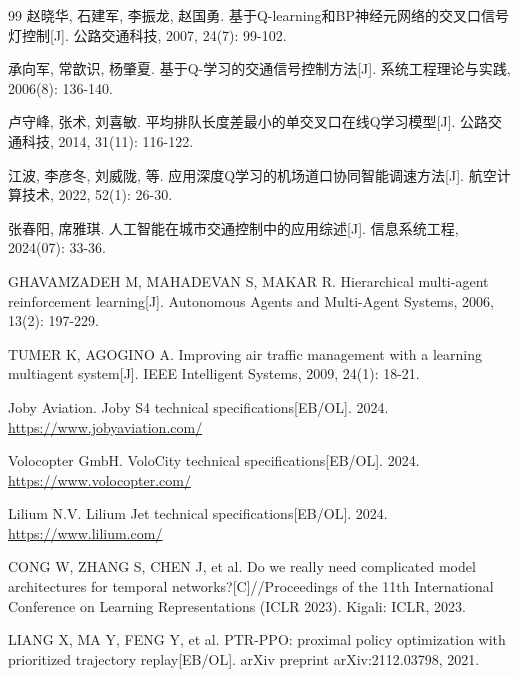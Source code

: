 \documentclass[12pt,a4paper,UTF8]{ctexart}
\begin{document}
\begin{thebibliography}{99}
 赵晓华, 石建军, 李振龙, 赵国勇. 基于Q-learning和BP神经元网络的交叉口信号灯控制[J]. 公路交通科技, 2007, 24(7): 99-102.

 承向军, 常歆识, 杨肇夏. 基于Q-学习的交通信号控制方法[J]. 系统工程理论与实践, 2006(8): 136-140.

 卢守峰, 张术, 刘喜敏. 平均排队长度差最小的单交叉口在线Q学习模型[J]. 公路交通科技, 2014, 31(11): 116-122.

 江波, 李彦冬, 刘威陇, 等. 应用深度Q学习的机场道口协同智能调速方法[J]. 航空计算技术, 2022, 52(1): 26-30.

 张春阳, 席雅琪. 人工智能在城市交通控制中的应用综述[J]. 信息系统工程, 2024(07): 33-36.

 GHAVAMZADEH M, MAHADEVAN S, MAKAR R. Hierarchical multi-agent reinforcement learning[J]. Autonomous Agents and Multi-Agent Systems, 2006, 13(2): 197-229.

 TUMER K, AGOGINO A. Improving air traffic management with a learning multiagent system[J]. IEEE Intelligent Systems, 2009, 24(1): 18-21.

 Joby Aviation. Joby S4 technical specifications[EB/OL]. 2024. \url{https://www.jobyaviation.com/}

 Volocopter GmbH. VoloCity technical specifications[EB/OL]. 2024. \url{https://www.volocopter.com/}

 Lilium N.V. Lilium Jet technical specifications[EB/OL]. 2024. \url{https://www.lilium.com/}

 CONG W, ZHANG S, CHEN J, et al. Do we really need complicated model architectures for temporal networks?[C]//Proceedings of the 11th International Conference on Learning Representations (ICLR 2023). Kigali: ICLR, 2023.

 LIANG X, MA Y, FENG Y, et al. PTR-PPO: proximal policy optimization with prioritized trajectory replay[EB/OL]. arXiv preprint arXiv:2112.03798, 2021.

\end{thebibliography}
\end{document}
